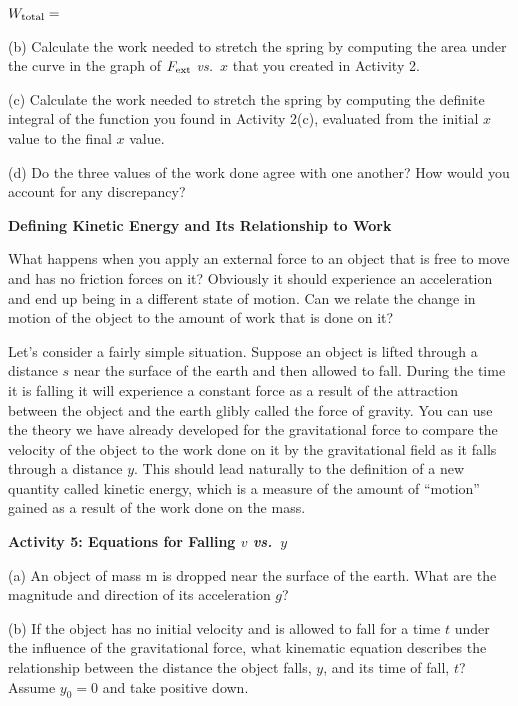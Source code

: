 \( W_{\rm total} =\) 
\vspace{5mm}

(b) Calculate the work needed to stretch the spring by computing the area under
the curve in the graph of \( F_{\rm ext} \) \textit{vs.}~$x$ that you created in Activity 2.
\answerspace{20mm}

(c) Calculate the work needed to stretch the spring by computing the definite 
integral of the function you found in Activity 2(c), evaluated from the 
initial $x$ value to the final $x$ value.
\answerspace{20mm}

(d) Do the three values of the work done agree with one another? How would 
you account for any discrepancy?
\answerspace{20mm}


\textbf{Defining Kinetic Energy and Its Relationship to Work} 

What happens when you apply an external force to an object that is free to move
and has no friction forces on it? Obviously it should experience an acceleration
and end up being in a different state of motion. Can we relate the change in
motion of the object to the amount of work that is done on it?

Let's consider a fairly simple situation. Suppose an object is lifted through
a distance $s$ near the surface of the earth and then allowed to fall. During
the time it is falling it will experience a constant force as a result of the
attraction between the object and the earth glibly called the force of gravity.
You can use the theory we have already developed for the gravitational force
to compare the velocity of the object to the work done on it by the gravitational
field as it falls through a distance 
$y$. This should lead naturally to the definition
of a new quantity called kinetic energy, which is a measure of the amount of
``motion'' gained as a result of the work done on the mass. 

\textbf{Activity 5: Equations for Falling $v$ \textit{vs.}~$y$ }

(a) An object of mass m is dropped near the surface of the earth. What are the
magnitude and direction of its acceleration $g$?
\answerspace{10mm}

(b) If the object has no initial velocity and is allowed to fall for a time
$t$ under the influence of the gravitational force, what kinematic equation describes the relationship between the distance the object falls, $y$, and its time of fall, $t$? Assume \( y_{0}=0 \) and take positive down.
\answerspace{10mm}

